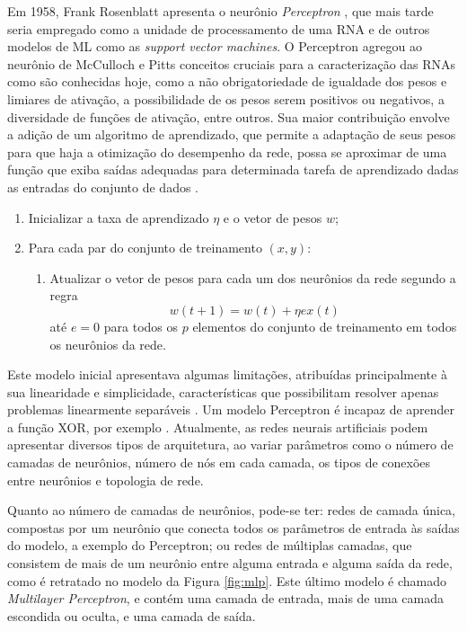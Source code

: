 Em 1958, Frank Rosenblatt apresenta o neurônio \emph{Perceptron} \cite{rosenblatt1958perceptron}, que mais tarde seria empregado como a unidade de processamento de uma RNA e de outros modelos de ML como as \emph{support vector machines}. O Perceptron agregou ao neurônio de McCulloch e Pitts conceitos cruciais para a caracterização das RNAs como são conhecidas hoje, como a não obrigatoriedade de igualdade dos pesos e limiares de ativação, a possibilidade de os pesos serem positivos ou negativos, a diversidade de funções de ativação, entre outros. Sua maior contribuição envolve a adição de um algoritmo de aprendizado, que permite a adaptação de seus pesos para que haja a otimização do desempenho da rede, possa se aproximar de uma função que exiba saídas adequadas para determinada tarefa de aprendizado dadas as entradas do conjunto de dados \cite{braga2000redes}.

\begin{enumerate}
	\item Inicializar a taxa de aprendizado $\eta$ e o vetor de pesos $w$;
	\item Para cada par do conjunto de treinamento $(x, y)$:
	\begin{enumerate}
		\item Atualizar o vetor de pesos para cada um dos neurônios da rede segundo a regra
		\begin{equation}\label{eq:regra_aprendizado}
			w(t+1) = w(t) + \eta e x(t)
		\end{equation}
		até $e = 0$ para todos os $p$ elementos do conjunto de treinamento em todos os neurônios da rede.
	\end{enumerate}
\end{enumerate}


Este modelo inicial apresentava algumas limitações, atribuídas principalmente à sua linearidade e simplicidade, características que possibilitam resolver apenas problemas linearmente separáveis \cite{braga2000redes}. Um modelo Perceptron é incapaz de aprender a função XOR, por exemplo \cite{goodfellow2016deep}. Atualmente, as redes neurais artificiais podem apresentar diversos tipos de arquitetura, ao variar parâmetros como o número de camadas de neurônios, número de nós em cada camada, os tipos de conexões entre neurônios e topologia de rede.

Quanto ao número de camadas de neurônios, pode-se ter: redes de camada única, compostas por um neurônio que conecta todos os parâmetros de entrada às saídas do modelo, a exemplo do Perceptron; ou redes de múltiplas camadas, que consistem de mais de um neurônio entre alguma entrada e alguma saída da rede, como é retratado no modelo da Figura \ref{fig:mlp}. Este último modelo é chamado \emph{Multilayer Perceptron}, e contém uma camada de entrada, mais de uma camada escondida ou oculta, e uma camada de saída.

